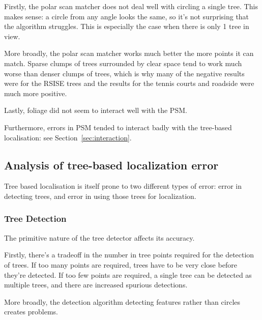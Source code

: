 \documentclass[12pt,oneside,a4paper]{book}
\begin{document}
Firstly, the polar scan matcher does not deal well with circling a
single tree. This makes sense: a circle from any angle looks the same,
so it's not surprising that the algorithm struggles. This is
especially the case when there is only 1 tree in view.

More broadly, the polar scan matcher works much better the more points
it can match. Sparse clumps of trees surrounded by clear space tend to
work much worse than denser clumps of trees, which is why many of the
negative results were for the RSISE trees and the results for the
tennis courts and roadside were much more positive.

Lastly, foliage did not seem to interact well with the PSM.

Furthermore, errors in PSM tended to interact badly with the
tree-based localisation: see Section~\ref{sec:interaction}.

\subsection{Analysis of tree-based localization error}
\label{sec:tree-error}

Tree based localisation is itself prone to two different types of
error: error in detecting trees, and error in using those trees for
localization.

\subsubsection{Tree Detection}
\label{sec:tree-detection}

The primitive nature of the tree detector affects its accuracy. 

Firstly, there's a tradeoff in the number in tree points required for
the detection of trees. If too many points are required, trees have to be very
close before they're detected. If too few points are required, a
single tree can be detected as multiple trees, and there are increased spurious detections.

More broadly, the detection algorithm detecting features rather than
circles creates problems.
\end{document}
